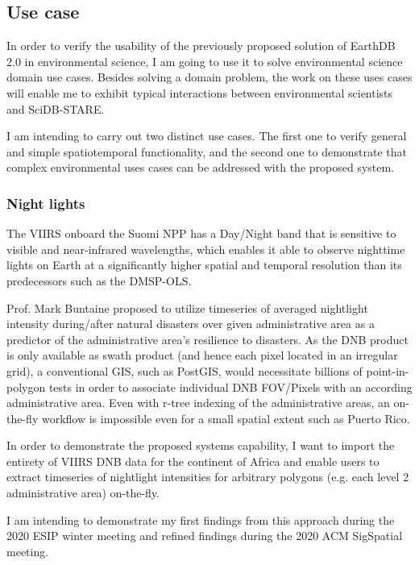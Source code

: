 \documentclass[letterpaper, parskip=half]{scrartcl}
\begin{document}
\newpage



\subsection{Use case}
In order to verify the usability of the previously proposed solution of EarthDB 2.0 in environmental science, I am going to use it to solve environmental science domain use cases. Besides solving a domain problem, the work on these uses cases will 
enable me to exhibit typical interactions between environmental scientists and SciDB-STARE.

I am intending to carry out two distinct use cases. The first one to verify general and simple spatiotemporal functionality, and the second one to demonstrate that complex environmental uses cases can be addressed with the proposed system.

\subsubsection{Night lights}
The \gls{VIIRS} onboard the Suomi \gls{NPP} has a Day/Night band that is sensitive to visible and near-infrared wavelengths, which enables it able to observe nighttime lights on Earth at a significantly higher spatial and temporal resolution than its predecessors such as the \gls{DMSP}-\gls{OLS}. 

Prof. Mark Buntaine proposed to utilize timeseries of averaged nightlight intensity during/after natural disasters over  given administrative area as a predictor of the administrative area's resilience to disasters. 
As the DNB product is only available as swath product (and hence each pixel located in an irregular grid), a conventional \gls{GIS}, such as PostGIS, would necessitate billions of point-in-polygon tests in order to associate individual DNB \gls{FOV}/Pixels with an according administrative area. Even with r-tree indexing of the administrative areas, an on-the-fly workflow is impossible even for a small spatial extent such as Puerto Rico.

In order to demonstrate the proposed systems capability, I want to import the entirety of VIIRS DNB data for the continent of Africa and enable users to extract timeseries of nightlight intensities for arbitrary polygons (e.g. each level 2 administrative area) on-the-fly. 

I am intending to demonstrate my first findings from this approach during the 2020 ESIP winter meeting and refined findings during the 2020 ACM SigSpatial meeting.
\end{document}
